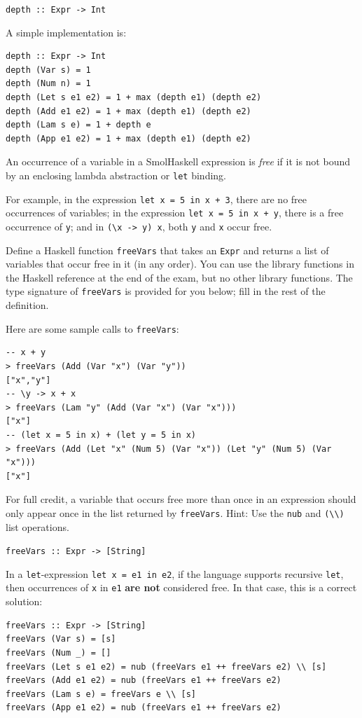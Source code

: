 \documentclass[addpoints]{exam}
\begin{document}
\begin{questions}
\verb|depth :: Expr -> Int|
\begin{solutionorbox}[\stretch{1}]
A simple implementation is:
  
\begin{verbatim}
depth :: Expr -> Int
depth (Var s) = 1
depth (Num n) = 1
depth (Let s e1 e2) = 1 + max (depth e1) (depth e2)
depth (Add e1 e2) = 1 + max (depth e1) (depth e2)
depth (Lam s e) = 1 + depth e
depth (App e1 e2) = 1 + max (depth e1) (depth e2)
\end{verbatim}
\end{solutionorbox}

\newpage

\question[10] An occurrence of a variable in a SmolHaskell expression is \emph{free} if it is not bound by an enclosing lambda abstraction or \verb|let| binding.

For example, in the expression \verb|let x = 5 in x + 3|, there are no free occurrences of variables; in the expression \verb|let x = 5 in x + y|, there is a free occurrence of \verb|y|; and in \verb|(\x -> y) x|, both \verb|y| and \verb|x| occur free.

Define a Haskell function \verb|freeVars| that takes an \verb|Expr| and returns a list of variables that occur free in it (in any order).  You can use the library functions in the Haskell reference at the end of the exam, but no other library functions. The type signature of \verb|freeVars| is provided for you below; fill in the rest of the definition.

Here are some sample calls to \verb|freeVars|:

\begin{verbatim}
-- x + y
> freeVars (Add (Var "x") (Var "y"))
["x","y"]
-- \y -> x + x
> freeVars (Lam "y" (Add (Var "x") (Var "x")))
["x"]
-- (let x = 5 in x) + (let y = 5 in x)
> freeVars (Add (Let "x" (Num 5) (Var "x")) (Let "y" (Num 5) (Var "x")))
["x"]
\end{verbatim}

For full credit, a variable that occurs free more than once in an expression should only appear once in the list returned by \texttt{freeVars}.  Hint: Use the \verb|nub| and \verb|(\\)| list operations.

\verb|freeVars :: Expr -> [String]|
\begin{solutionorbox}[\stretch{1}]
In a \verb|let|-expression \verb|let x = e1 in e2|, if the language supports recursive \verb|let|, then occurrences of \verb|x| in \verb|e1| \textbf{are not} considered free.  In that case, this is a correct solution:
\begin{verbatim}
freeVars :: Expr -> [String]
freeVars (Var s) = [s]
freeVars (Num _) = []
freeVars (Let s e1 e2) = nub (freeVars e1 ++ freeVars e2) \\ [s]
freeVars (Add e1 e2) = nub (freeVars e1 ++ freeVars e2)
freeVars (Lam s e) = freeVars e \\ [s]
freeVars (App e1 e2) = nub (freeVars e1 ++ freeVars e2)
\end{verbatim}


\end{solutionorbox}
\end{questions}
\end{document}
